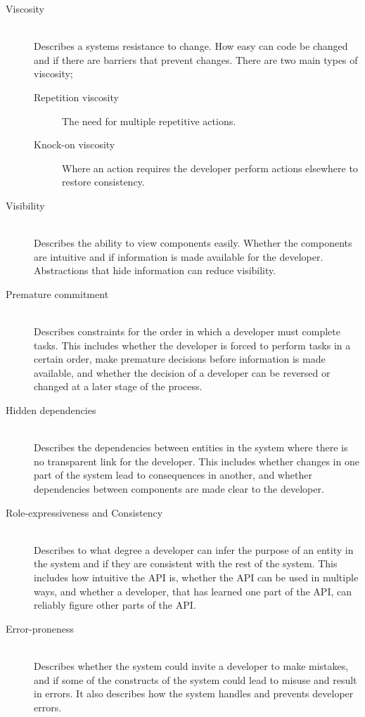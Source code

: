 \begin{description}
    \item[Viscosity]\hfill\\
    Describes a systems resistance to change. How easy can code be changed and if there are barriers that prevent changes. There are two main types of viscosity;
    \begin{description}
        \item[Repetition viscosity] The need for multiple repetitive actions.
        \item[Knock-on viscosity] Where an action requires the developer perform actions elsewhere to restore consistency. 
    \end{description}
    \item[Visibility]\hfill\\
    Describes the ability to view components easily. Whether the components are intuitive and if information is made available for the developer. Abstractions that hide information can reduce visibility.
    \item[Premature commitment]\hfill\\
    Describes constraints for the order in which a developer must complete tasks. This includes whether the developer is forced to perform tasks in a certain order, make premature decisions before information is made available, and whether the decision of a developer can be reversed or changed at a later stage of the process.
    \item[Hidden dependencies]\hfill\\ %
    Describes the dependencies between entities in the system where there is no transparent link for the developer. This includes whether changes in one part of the system lead to consequences in another, and whether dependencies between components are made clear to the developer.
    \item[Role-expressiveness and Consistency]\hfill\\
    Describes to what degree a developer can infer the purpose of an entity in the system and if they are consistent with the rest of the system. This includes how intuitive the API is, whether the API can be used in multiple ways, and whether a developer, that has learned one part of the API, can reliably figure other parts of the API. 
    \item[Error-proneness]\hfill\\
    Describes whether the system could invite a developer to make mistakes, and if some of the constructs of the system could lead to misuse and result in errors. It also describes how the system handles and prevents developer errors.

\end{description}
